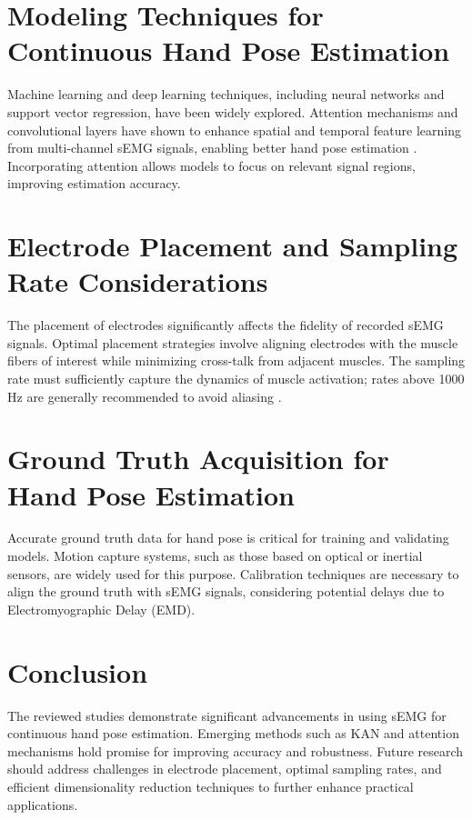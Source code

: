 \section{Modeling Techniques for Continuous Hand Pose Estimation}
Machine learning and deep learning techniques, including neural networks and support vector regression, have been widely explored. Attention mechanisms and convolutional layers have shown to enhance spatial and temporal feature learning from multi-channel sEMG signals, enabling better hand pose estimation \cite{zhai2017semgcnn}. Incorporating attention allows models to focus on relevant signal regions, improving estimation accuracy.

\section{Electrode Placement and Sampling Rate Considerations}
The placement of electrodes significantly affects the fidelity of recorded sEMG signals. Optimal placement strategies involve aligning electrodes with the muscle fibers of interest while minimizing cross-talk from adjacent muscles. The sampling rate must sufficiently capture the dynamics of muscle activation; rates above 1000 Hz are generally recommended to avoid aliasing \cite{clancy2002sampling}.

\section{Ground Truth Acquisition for Hand Pose Estimation}
Accurate ground truth data for hand pose is critical for training and validating models. Motion capture systems, such as those based on optical or inertial sensors, are widely used for this purpose. Calibration techniques are necessary to align the ground truth with sEMG signals, considering potential delays due to Electromyographic Delay (EMD).

\section{Conclusion}
The reviewed studies demonstrate significant advancements in using sEMG for continuous hand pose estimation. Emerging methods such as KAN and attention mechanisms hold promise for improving accuracy and robustness. Future research should address challenges in electrode placement, optimal sampling rates, and efficient dimensionality reduction techniques to further enhance practical applications.

